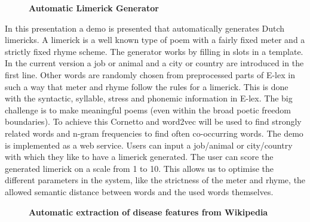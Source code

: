 \documentclass[10pt, a4paper, twopage, headinclude, footinclude, BCOR5mm]{book}
\begin{document}
\newpage

\begin{figure}[t!]
\centering
\large\textbf{Automatic Limerick Generator}
\vspace*{0.5cm}
\end{figure}


\begin{table}[t!]
\end{table} 
\noindent
In this presentation a demo is presented that automatically generates Dutch limericks. A limerick is a well known type of poem with a fairly fixed meter and a strictly fixed rhyme scheme. The generator works by filling in slots in a template. In the current version a job or animal and a city or country are introduced in the first line. Other words are randomly chosen from preprocessed parts of E-lex in such a way that meter and rhyme follow the rules for a limerick. This is done with the syntactic, syllable, stress and phonemic information in E-lex. The big challenge is to make meaningful poems (even within the broad poetic freedom boundaries). To achieve this Cornetto and word2vec will be used to find strongly related words and n-gram frequencies to find often co-occurring words.  The demo is implemented as a web service. Users can input a job/animal or city/country with which they like to have a limerick generated. The user can score the generated limerick on a scale from 1 to 10. This allows us to optimise the different parameters in the system, like the strictness of the meter and rhyme, the allowed semantic distance between words and the used words themselves.   

\newpage

\begin{figure}[t!]
\centering
\large\textbf{Automatic extraction of disease features from Wikipedia}
\vspace*{0.5cm}
\end{figure}
\end{document}
